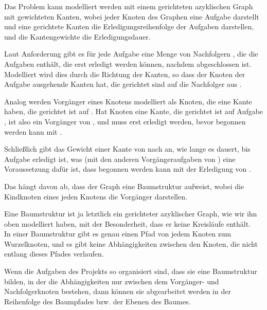 \newpage
\begin{aufgabe}
\begin{teile}
	\item
	Das Problem kann modelliert werden mit einem gerichteten azyklischen Graph mit gewichteten Kanten, wobei jeder Knoten des Graphen eine Aufgabe darstellt und eine gerichtete Kanten die Erledigungsreihenfolge der Aufgaben darstellen, und die Kantengewichte die Erledigungsdauer.

	Laut Anforderung gibt es für jede Aufgabe  eine Menge von Nachfolgern , die die Aufgaben enthält, die erst erledigt werden können, nachdem  abgeschlossen ist. Modelliert wird dies durch die Richtung der Kanten, so dass der Knoten der Aufgabe  ausgehende Kanten hat, die gerichtet sind auf die Nachfolger aus .

	Analog werden Vorgänger eines Knotens   modelliert als Knoten, die eine Kante haben, die gerichtet ist auf . Hat Knoten  eine Kante, die gerichtet ist auf Aufgabe , ist  also ein Vorgänger von , und muss erst erledigt werden, bevor begonnen werden kann mit .
	
	Schließlich gibt das Gewicht  einer Kante von  nach  an, wie lange es dauert, bis Aufgabe  erledigt ist, was (mit den anderen Vorgängeraufgaben von ) eine Voraussetzung dafür ist, dass begonnen werden kann mit der Erledigung von . \\
	
	\item
	Das hängt davon ab, dass der Graph eine Baumstruktur aufweist, wobei die Kindknoten eines jeden Knotens die Vorgänger darstellen.
	
	Eine Baumstruktur ist ja letztlich ein gerichteter azyklischer Graph, wie wir ihn oben modelliert haben, mit der Besonderheit, dass er keine Kreisläufe enthält. \\
	In einer Baumstruktur gibt es genau einen Pfad von jedem Knoten zum Wurzelknoten, und es gibt keine Abhängigkeiten zwischen den Knoten, die nicht entlang dieses Pfades verlaufen.
	
	Wenn die Aufgaben des Projekts so organisiert sind, dass sie eine Baumstruktur bilden, in der die Abhängigkeiten nur zwischen dem Vorgänger- und Nachfolgerknoten bestehen, dann können sie abgearbeitet werden in der Reihenfolge des Baumpfades bzw. der Ebenen des Baumes. \\
	

\end{teile}
\end{aufgabe}
